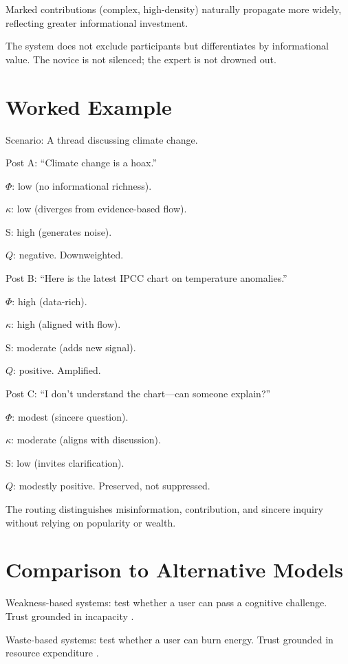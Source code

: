\documentclass{book}
\begin{document}
Marked contributions (complex, high-density) naturally propagate more widely, reflecting greater informational investment.

The system does not exclude participants but differentiates by informational value. The novice is not silenced; the expert is not drowned out.

\section{Worked Example}

Scenario: A thread discussing climate change.

Post A: “Climate change is a hoax.”

\(\Phi\): low (no informational richness).

\(\kappa\): low (diverges from evidence-based flow).

S: high (generates noise).

\( Q \): negative. Downweighted.

Post B: “Here is the latest IPCC chart on temperature anomalies.”

\(\Phi\): high (data-rich).

\(\kappa\): high (aligned with flow).

S: moderate (adds new signal).

\( Q \): positive. Amplified.

Post C: “I don’t understand the chart—can someone explain?”

\(\Phi\): modest (sincere question).

\(\kappa\): moderate (aligns with discussion).

S: low (invites clarification).

\( Q \): modestly positive. Preserved, not suppressed.

The routing distinguishes misinformation, contribution, and sincere inquiry without relying on popularity or wealth.

\section{Comparison to Alternative Models}

Weakness-based systems: test whether a user can pass a cognitive challenge. Trust grounded in incapacity \cite{conitzer2020}.

Waste-based systems: test whether a user can burn energy. Trust grounded in resource expenditure \cite{nakamoto2008}.
\end{document}
